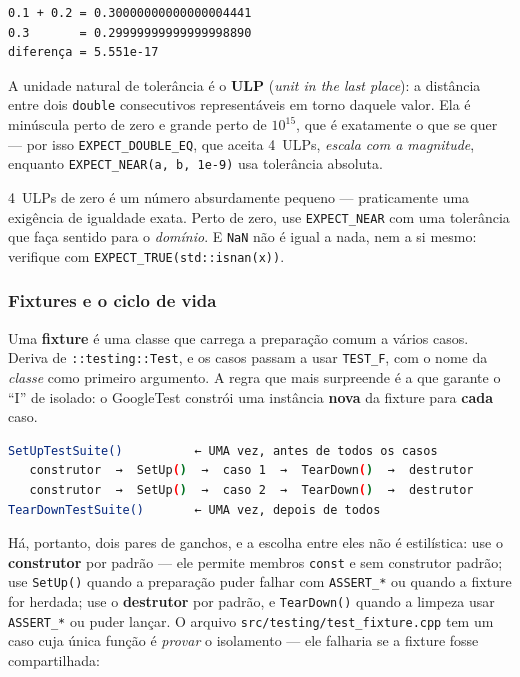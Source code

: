 \begin{lstlisting}[style=bt, language=bash,
    caption={Saída de \texttt{src/testing/}: por que \texttt{==} não serve.}]
0.1 + 0.2 = 0.30000000000000004441
0.3       = 0.29999999999999998890
diferença = 5.551e-17
\end{lstlisting}

A unidade natural de tolerância é o \textbf{ULP} (\emph{unit in the last place}):
a distância entre dois \texttt{double} consecutivos representáveis em torno
daquele valor. Ela é minúscula perto de zero e grande perto de $10^{15}$, que é
exatamente o que se quer --- por isso \texttt{EXPECT\_DOUBLE\_EQ}, que aceita
4~ULPs, \emph{escala com a magnitude}, enquanto \texttt{EXPECT\_NEAR(a, b, 1e-9)}
usa tolerância absoluta.

\begin{armadilha}
4~ULPs de zero é um número absurdamente pequeno --- praticamente uma exigência de
igualdade exata. Perto de zero, use \texttt{EXPECT\_NEAR} com uma tolerância que
faça sentido para o \emph{domínio}. E \texttt{NaN} não é igual a nada, nem a si
mesmo: verifique com \texttt{EXPECT\_TRUE(std::isnan(x))}.
\end{armadilha}

\subsubsection{Fixtures e o ciclo de vida}

Uma \textbf{fixture} é uma classe que carrega a preparação comum a vários casos.
Deriva de \texttt{::testing::Test}, e os casos passam a usar \texttt{TEST\_F},
com o nome da \emph{classe} como primeiro argumento. A regra que mais surpreende
é a que garante o ``I'' de isolado: o GoogleTest constrói uma instância
\textbf{nova} da fixture para \textbf{cada} caso.

\begin{lstlisting}[style=bt, language=bash,
    caption={O ciclo de vida, resumo de \texttt{src/testing/demo\_organizacao.hpp}.}]
SetUpTestSuite()          ← UMA vez, antes de todos os casos
   construtor  →  SetUp()  →  caso 1  →  TearDown()  →  destrutor
   construtor  →  SetUp()  →  caso 2  →  TearDown()  →  destrutor
TearDownTestSuite()       ← UMA vez, depois de todos
\end{lstlisting}

Há, portanto, dois pares de ganchos, e a escolha entre eles não é estilística:
use o \textbf{construtor} por padrão --- ele permite membros \texttt{const} e sem
construtor padrão; use \texttt{SetUp()} quando a preparação puder falhar com
\texttt{ASSERT\_*} ou quando a fixture for herdada; use o \textbf{destrutor} por
padrão, e \texttt{TearDown()} quando a limpeza usar \texttt{ASSERT\_*} ou puder
lançar. O arquivo \texttt{src/testing/test\_fixture.cpp} tem um caso cuja única
função é \emph{provar} o isolamento --- ele falharia se a fixture fosse
compartilhada:

